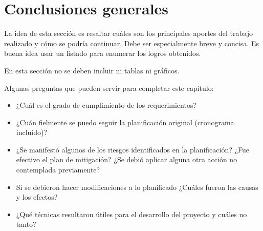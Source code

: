 \section{Conclusiones generales }

La idea de esta sección es resaltar cuáles son los principales aportes del trabajo realizado y cómo se podría continuar. Debe ser especialmente breve y concisa. Es buena idea usar un listado para enumerar los logros obtenidos.

En esta sección no se deben incluir ni tablas ni gráficos.

Algunas preguntas que pueden servir para completar este capítulo:

\begin{itemize}
\item ¿Cuál es el grado de cumplimiento de los requerimientos?
\item ¿Cuán fielmente se puedo seguir la planificación original (cronograma incluido)?
\item ¿Se manifestó algunos de los riesgos identificados en la planificación? ¿Fue efectivo el plan de mitigación? ¿Se debió aplicar alguna otra acción no contemplada previamente?
\item Si se debieron hacer modificaciones a lo planificado ¿Cuáles fueron las causas y los efectos?
\item ¿Qué técnicas resultaron útiles para el desarrollo del proyecto y cuáles no tanto?
\end{itemize}